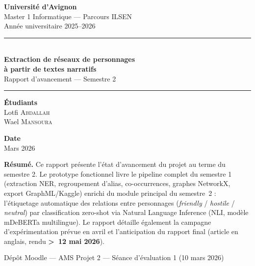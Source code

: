 \documentclass[a4paper,11pt]{article}
\begin{document}
\begin{titlepage}
  \centering
  \vspace*{1.5cm}

  {\Large\bfseries\color{mainblue} Université d'Avignon}\\[0.3cm]
  {\normalsize Master 1 Informatique --- Parcours ILSEN}\\[0.3cm]
  {\normalsize Année universitaire 2025--2026}

  \vspace{1.5cm}
  \noindent\rule{\textwidth}{1.5pt}\\[0.5cm]
  {\LARGE\bfseries\color{mainblue}
    Extraction de réseaux de personnages\\[8pt]
    à partir de textes narratifs}\\[0.4cm]
  {\Large Rapport d'avancement --- Semestre 2}
  \\[0.3cm]
  \noindent\rule{\textwidth}{1.5pt}

  \vspace{1.5cm}

  \begin{minipage}{0.48\textwidth}
    \centering
    \textbf{Étudiants}\\[4pt]
    Lotfi \textsc{Abdallah}\\
    Wael \textsc{Mansoura}
  \end{minipage}
  \hfill
  \begin{minipage}{0.48\textwidth}
    \centering
    \textbf{Date}\\[4pt]
    Mars 2026
  \end{minipage}

  \vspace{1.5cm}

  \begin{mdframed}[backgroundcolor=lightblue, linecolor=accentblue, linewidth=1pt,
                   innertopmargin=10pt, innerbottommargin=10pt,
                   innerleftmargin=14pt, innerrightmargin=14pt]
    \small
    \textbf{Résumé.} Ce rapport présente l'état d'avancement du projet au terme du semestre 2.
    Le prototype fonctionnel livre le pipeline complet du semestre 1 (extraction NER, regroupement d'alias,
    co-occurrences, graphes NetworkX, export GraphML/Kaggle) enrichi du module principal du semestre~2 :
    l'étiquetage automatique des relations entre personnages (\textit{friendly} / \textit{hostile} / \textit{neutral})
    par classification zero-shot via Natural Language Inference (NLI, modèle mDeBERTa multilingue).
    Le rapport détaille également la campagne d'expérimentation prévue en avril et l'anticipation du rapport
    final (article en anglais, rendu \textbf{>~12 mai 2026}).
  \end{mdframed}

  \vfill
  {\small Dépôt Moodle --- AMS Projet 2 --- Séance d'évaluation 1 (10 mars 2026)}
\end{titlepage}
\end{document}
